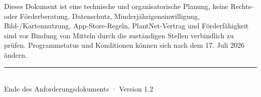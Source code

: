 \documentclass[10pt,a4paper,oneside]{article}
\begin{document}
\begin{riskbox}[title={\textbf{Hinweis zu Recht und Förderung}}]
Dieses Dokument ist eine technische und organisatorische Planung, keine Rechts- oder Förderberatung. Datenschutz, Minderjährigeneinwilligung, Bild-/Kartennutzung, App-Store-Regeln, PlantNet-Vertrag und Förderfähigkeit sind vor Bindung von Mitteln durch die zuständigen Stellen verbindlich zu prüfen. Programmstatus und Konditionen können sich nach dem 17. Juli 2026 ändern.
\end{riskbox}

\vfill
\begin{center}
\textcolor{Sage}{\rule{35mm}{0.6pt}}\\[2mm]
 {\small\textcolor{Muted}{Ende des Anforderungsdokuments · Version 1.2}}
\end{center}
\end{document}
